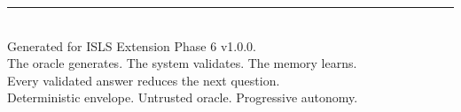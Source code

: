 \documentclass[11pt,a4paper,twoside]{article}
\theoremstyle{definition}
\theoremstyle{plain}
\theoremstyle{remark}
\newcommand{\ISLS}{\textsf{ISLS}}
\begin{document}
\vfill
\begin{center}
\rule{0.5\textwidth}{0.4pt}\\[0.5cm]
{\small Generated for \ISLS{} Extension Phase 6 v1.0.0.\\
The oracle generates. The system validates. The memory learns.\\
Every validated answer reduces the next question.\\[0.3cm]
Deterministic envelope. Untrusted oracle. Progressive autonomy.}
\end{center}
\end{document}
